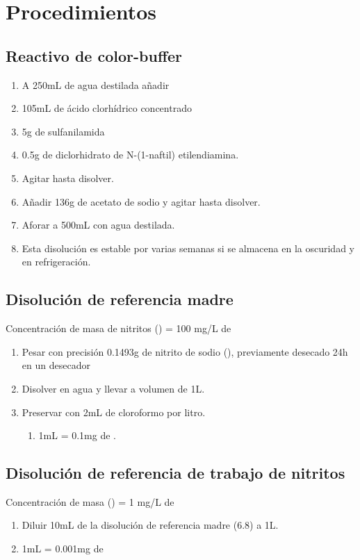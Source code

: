\section{Procedimientos}

\subsection{Reactivo de color-buffer}
\begin{enumerate}
    \item A 250mL de agua destilada añadir
    \item 105mL de ácido clorhídrico concentrado
    \item 5g de sulfanilamida
    \item 0.5g de diclorhidrato de N-(1-naftil) etilendiamina.
    \item Agitar hasta disolver.
    \item Añadir 136g de acetato de sodio y agitar hasta disolver.
    \item Aforar a 500mL con agua destilada.
    \item Esta disolución es estable por varias semanas si se almacena en la oscuridad y en refrigeración. 
\end{enumerate}

\subsection{Disolución de referencia madre}
Concentración de masa de nitritos () = 100 mg/L de 
\begin{enumerate}
    \item Pesar con precisión 0.1493g de nitrito de sodio (), previamente desecado 24h en un desecador
    \item Disolver en agua y llevar a volumen de 1L.
    \item Preservar con 2mL de cloroformo por litro.
    \begin{enumerate}
        \item 1mL = 0.1mg de .
    \end{enumerate}
\end{enumerate}

\subsection{Disolución de referencia de trabajo de nitritos}
Concentración de masa () = 1 mg/L de 
\begin{enumerate}
    \item Diluir 10mL de la disolución de referencia madre (6.8) a 1L.
    \item 1mL = 0.001mg de 
\end{enumerate}


